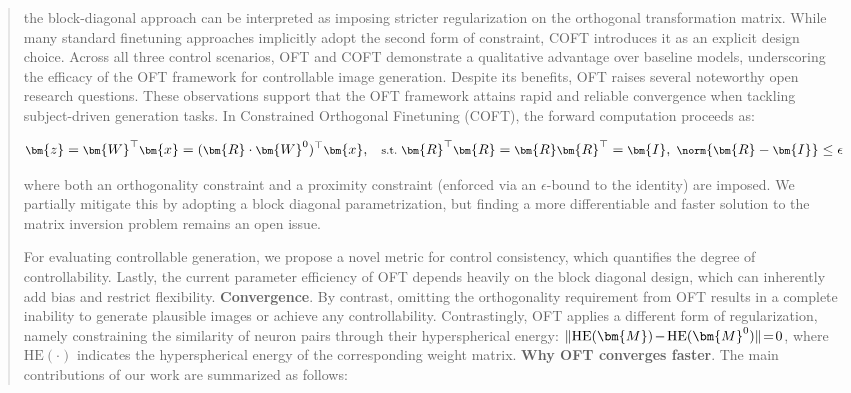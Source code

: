 {\begin{abstract}
the block-diagonal approach can be interpreted as imposing stricter regularization on the orthogonal transformation matrix. While many standard finetuning approaches implicitly adopt the second form of constraint, COFT introduces it as an explicit design choice. Across all three control scenarios, OFT and COFT demonstrate a qualitative advantage over baseline models, underscoring the efficacy of the OFT framework for controllable image generation. Despite its benefits, OFT raises several noteworthy open research questions. These observations support that the OFT framework attains rapid and reliable convergence when tackling subject-driven generation tasks. In Constrained Orthogonal Finetuning (COFT), the forward computation proceeds as:

\begin{equation}\label{eq:coft_general}
    \footnotesize
    \bm{z}=\bm{W}^\top\bm{x}=(\bm{R}\cdot\bm{W}^0)^\top\bm{x},~~~\text{s.t.}~\bm{R}^\top\bm{R}=\bm{R}\bm{R}^\top=\bm{I},~\norm{\bm{R}-\bm{I}}\leq \epsilon
\end{equation}

where both an orthogonality constraint and a proximity constraint (enforced via an $\epsilon$-bound to the identity) are imposed. We partially mitigate this by adopting a block diagonal parametrization, but finding a more differentiable and faster solution to the matrix inversion problem remains an open issue. \item For evaluating controllable generation, we propose a novel metric for control consistency, which quantifies the degree of controllability. Lastly, the current parameter efficiency of OFT depends heavily on the block diagonal design, which can inherently add bias and restrict flexibility. \textbf{Convergence}. By contrast, omitting the orthogonality requirement from OFT results in a complete inability to generate plausible images or achieve any controllability. Contrastingly, OFT applies a different form of regularization, namely constraining the similarity of neuron pairs through their hyperspherical energy: $\thickmuskip=2mu \medmuskip=2mu \| \text{HE}(\bm{M})-\text{HE}(\bm{M}^0) \|=0$, where $\text{HE}(\cdot)$ indicates the hyperspherical energy of the corresponding weight matrix. \textbf{Why OFT converges faster}. The main contributions of our work are summarized as follows:

\begin{itemize}[leftmargin=*,nosep]


\end{itemize}
\end{abstract}}

